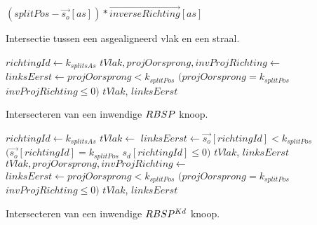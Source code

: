\begin{dutchalgorithm}
    \begin{algorithmic}       
            \State \Return $(splitPos - \vec{s_o}[as]) * \vec{inverseRichting}[as]$
        \EndFunction
    \end{algorithmic}
    \caption{Intersectie tussen een asgealigneerd vlak en een straal.}
\end{dutchalgorithm}

\begin{dutchalgorithm}
    \begin{algorithmic}       
            \State $richtingId \gets k_{splitsAs}$
            \State $tVlak, projOorsprong, invProjRichting \gets $ 
            \State $linksEerst \gets projOorsprong < k_{splitPos}$ \Or $(projOorsprong = k_{splitPos}$ \And $invProjRichting \leq 0)$
            \State \Return $tVlak$, $linksEerst$
        \EndFunction
    \end{algorithmic}
    \caption{Intersecteren van een inwendige $RBSP$ knoop.}
\end{dutchalgorithm}

\begin{dutchalgorithm}
    \begin{algorithmic}       
            \State $richtingId \gets k_{splitsAs}$
                \State $tVlak \gets $ 
                \State $linksEerst \gets \vec{s_o}[richtingId] < k_{splitPos}$ \Or $(\vec{s_o}[richtingId] = k_{splitPos}$ \And $s_d[richtingId] \leq 0)$
                \State \Return $tVlak$, $linksEerst$
            \Else
                \State $tVlak, projOorsprong, invProjRichting \gets $ 
                 \State $linksEerst \gets projOorsprong < k_{splitPos}$ \Or $(projOorsprong = k_{splitPos}$ \And $invProjRichting \leq 0)$
                \State \Return $tVlak$, $linksEerst$
            \EndIf
        \EndFunction
    \end{algorithmic}
    \caption{Intersecteren van een inwendige $RBSP^{Kd}$ knoop.}
\end{dutchalgorithm}


